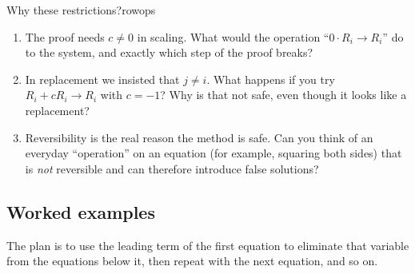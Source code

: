 \documentclass[11pt]{article}
\begin{document}
\begin{think}{Why these restrictions?}{rowops}
\begin{enumerate}[label=(\arabic*)]
  \item The proof needs $c\neq0$ in scaling. What would the operation ``$0\cdot R_i\to R_i$'' do to
        the system, and exactly which step of the proof breaks?
  \item In replacement we insisted that $j\neq i$. What happens if you try
        $R_i+cR_i\to R_i$ with $c=-1$? Why is that not safe, even though it looks like a
        replacement?
  \item Reversibility is the real reason the method is safe. Can you think of an everyday
        ``operation'' on an equation (for example, squaring both sides) that is \emph{not}
        reversible and can therefore introduce false solutions?
\end{enumerate}
\end{think}
 
\subsection*{Worked examples}
 
The plan is to use the leading term of the first equation to eliminate that variable from the
equations below it, then repeat with the next equation, and so on.
 
\end{document}
